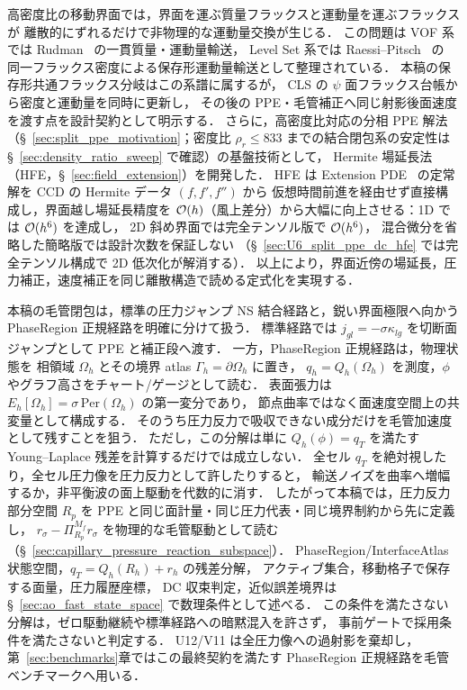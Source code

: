 高密度比の移動界面では，界面を運ぶ質量フラックスと運動量を運ぶフラックスが
離散的にずれるだけで非物理的な運動量交換が生じる．
この問題は VOF 系では Rudman~\cite{Rudman1998} の一貫質量・運動量輸送，
Level Set 系では Raessi--Pitsch~\cite{RaessiPitsch2012} の
同一フラックス密度による保存形運動量輸送として整理されている．
本稿の保存形共通フラックス分岐はこの系譜に属するが，
CLS の $\psi$ 面フラックス台帳から密度と運動量を同時に更新し，
その後の PPE・毛管補正へ同じ射影後面速度を渡す点を設計契約として明示する．
さらに，高密度比対応の分相 PPE 解法（§~\ref{sec:split_ppe_motivation}；密度比 $\rho_r\le 833$ までの結合閉包系の安定性は §~\ref{sec:density_ratio_sweep} で確認）の基盤技術として，
Hermite 場延長法（HFE，§~\ref{sec:field_extension}）を開発した．
HFE は Extension PDE~\cite{Aslam2004} の定常解を CCD の Hermite データ $(f,f',f'')$ から
仮想時間前進を経由せず直接構成し，界面越し場延長精度を
$\mathcal{O}(h)$（風上差分）から大幅に向上させる：1D では $\mathcal{O}(h^6)$ を達成し，
2D 斜め界面では完全テンソル版で $\mathcal{O}(h^6)$，
混合微分を省略した簡略版では設計次数を保証しない
（§~\ref{sec:U6_split_ppe_dc_hfe} では完全テンソル構成で 2D 低次化が解消する）．
以上により，界面近傍の場延長，圧力補正，速度補正を同じ離散構造で読める定式化を実現する．

本稿の毛管閉包は，標準の圧力ジャンプ NS 結合経路と，鋭い界面極限へ向かう
PhaseRegion 正規経路を明確に分けて扱う．
標準経路では $j_{gl}=-\sigma\kappa_{lg}$ を切断面ジャンプとして PPE と補正段へ渡す．
一方，PhaseRegion 正規経路は，物理状態を
相領域 $\Omega_h$ とその境界 atlas $\Gamma_h=\partial\Omega_h$ に置き，
$q_h=Q_h(\Omega_h)$ を測度，$\phi$ やグラフ高さをチャート/ゲージとして読む．
表面張力は $E_h[\Omega_h]=\sigma\,\mathrm{Per}(\Omega_h)$ の第一変分であり，
節点曲率ではなく面速度空間上の共変量として構成する．
そのうち圧力反力で吸収できない成分だけを毛管加速度として残すことを狙う．
ただし，この分解は単に $Q_h(\phi)=q_T$ を満たす
Young--Laplace 残差を計算するだけでは成立しない．
全セル $q_T$ を絶対視したり，全セル圧力像を圧力反力として許したりすると，
輸送ノイズを曲率へ増幅するか，非平衡波の面上駆動を代数的に消す．
したがって本稿では，圧力反力部分空間 $R_p$ を PPE と同じ面計量・同じ圧力代表・同じ境界制約から先に定義し，
$r_\sigma-\Pi^{M_f}_{R_p}r_\sigma$ を物理的な毛管駆動として読む
（§~\ref{sec:capillary_pressure_reaction_subspace}）．
PhaseRegion/InterfaceAtlas 状態空間，$q_T=Q_h(R_h)+r_h$ の残差分解，
アクティブ集合，移動格子で保存する面量，圧力履歴座標，
DC 収束判定，近似誤差境界は
§~\ref{sec:ao_fast_state_space} で数理条件として述べる．
この条件を満たさない分解は，ゼロ駆動継続や標準経路への暗黙混入を許さず，
事前ゲートで採用条件を満たさないと判定する．
U12/V11 は全圧力像への過射影を棄却し，
第~\ref{sec:benchmarks}章ではこの最終契約を満たす
PhaseRegion 正規経路を毛管ベンチマークへ用いる．

